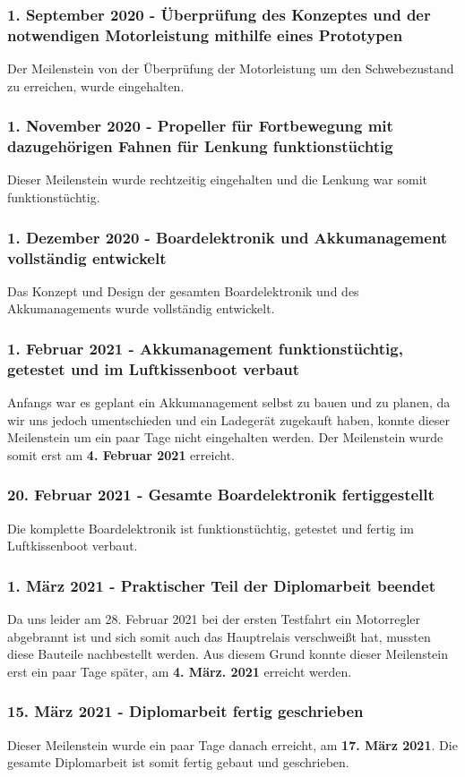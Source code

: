 
\subsubsection*{1. September 2020 - Überprüfung des Konzeptes und der notwendigen Motorleistung mithilfe eines Prototypen}
Der Meilenstein von der Überprüfung der Motorleistung um den Schwebezustand zu erreichen, wurde eingehalten.  

\subsubsection*{1. November 2020 - Propeller für Fortbewegung mit dazugehörigen Fahnen für Lenkung funktionstüchtig}
Dieser Meilenstein wurde rechtzeitig eingehalten und die Lenkung war somit funktionstüchtig. 

\subsubsection*{1. Dezember 2020 - Boardelektronik und  Akkumanagement vollständig entwickelt}
Das Konzept und Design der gesamten Boardelektronik und des Akkumanagements wurde  vollständig entwickelt. \\

\subsubsection*{1. Februar 2021 - Akkumanagement funktionstüchtig, getestet und im Luftkissenboot verbaut}
Anfangs war es geplant ein Akkumanagement selbst zu bauen und zu planen, da wir uns jedoch umentschieden und ein Ladegerät zugekauft haben, konnte dieser Meilenstein um ein paar Tage 
nicht eingehalten werden. Der Meilenstein wurde somit erst am \textbf{4. Februar 2021} erreicht.\\


\subsubsection*{20. Februar 2021 - Gesamte Boardelektronik fertiggestellt}
Die komplette Boardelektronik ist funktionstüchtig, getestet und fertig im Luftkissenboot verbaut. 

\subsubsection*{1. März 2021 - Praktischer Teil der Diplomarbeit beendet}
Da uns leider am 28. Februar 2021 bei der ersten Testfahrt ein Motorregler abgebrannt ist und sich somit auch das Hauptrelais verschweißt hat, mussten
diese Bauteile nachbestellt werden. Aus diesem Grund konnte dieser Meilenstein erst ein paar Tage später, am \textbf{4. März. 2021} erreicht werden.  

\subsubsection*{15. März 2021 - Diplomarbeit fertig geschrieben}
Dieser Meilenstein wurde ein paar Tage danach erreicht, am \textbf{17. März 2021}. Die gesamte Diplomarbeit ist somit fertig gebaut und geschrieben. 

